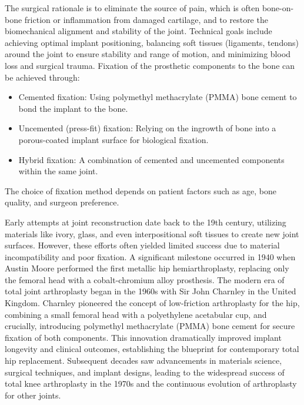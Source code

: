 The surgical rationale is to eliminate the source of pain, which is often bone-on-bone friction or inflammation from damaged cartilage, and to restore the biomechanical alignment and stability of the joint. Technical goals include achieving optimal implant positioning, balancing soft tissues (ligaments, tendons) around the joint to ensure stability and range of motion, and minimizing blood loss and surgical trauma. Fixation of the prosthetic components to the bone can be achieved through:
\begin{itemize}
  \item Cemented fixation: Using polymethyl methacrylate (PMMA) bone cement to bond the implant to the bone.
  \item Uncemented (press-fit) fixation: Relying on the ingrowth of bone into a porous-coated implant surface for biological fixation.
  \item Hybrid fixation: A combination of cemented and uncemented components within the same joint.
\end{itemize}
The choice of fixation method depends on patient factors such as age, bone quality, and surgeon preference.

Early attempts at joint reconstruction date back to the 19th century, utilizing materials like ivory, glass, and even interpositional soft tissues to create new joint surfaces. However, these efforts often yielded limited success due to material incompatibility and poor fixation. A significant milestone occurred in 1940 when Austin Moore performed the first metallic hip hemiarthroplasty, replacing only the femoral head with a cobalt-chromium alloy prosthesis. The modern era of total joint arthroplasty began in the 1960s with Sir John Charnley in the United Kingdom. Charnley pioneered the concept of low-friction arthroplasty for the hip, combining a small femoral head with a polyethylene acetabular cup, and crucially, introducing polymethyl methacrylate (PMMA) bone cement for secure fixation of both components. This innovation dramatically improved implant longevity and clinical outcomes, establishing the blueprint for contemporary total hip replacement. Subsequent decades saw advancements in materials science, surgical techniques, and implant designs, leading to the widespread success of total knee arthroplasty in the 1970s and the continuous evolution of arthroplasty for other joints.

